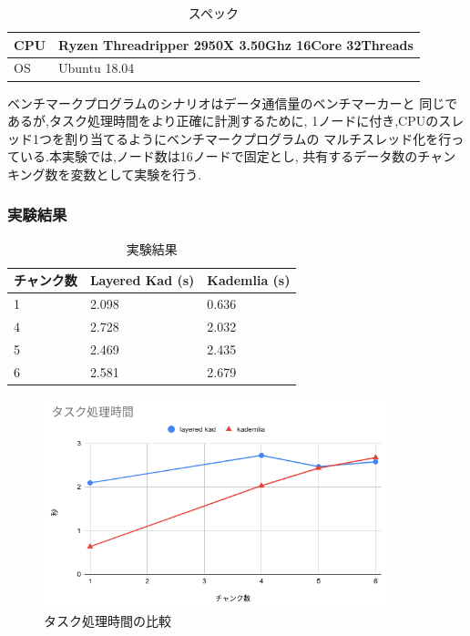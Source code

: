 \documentclass[sotsuron]{jcsie}
\begin{document}
\begin{table}[H]
	\caption{スペック}	
	\centering
	\label{table:spec-ryzen}
	\begin{tabular}{|l|l|}
		\hline
		CPU &   
		Ryzen Threadripper 2950X 3.50Ghz 16Core 32Threads \\ 
		\hline	
		OS  &   
		Ubuntu 18.04 \\ 
		\hline
	\end{tabular}	
\end{table}

ベンチマークプログラムのシナリオはデータ通信量のベンチマーカーと
同じであるが,タスク処理時間をより正確に計測するために,
1ノードに付き,CPUのスレッド1つを割り当てるようにベンチマークプログラムの
マルチスレッド化を行っている.本実験では,ノード数は16ノードで固定とし,
共有するデータ数のチャンキング数を変数として実験を行う.

\subsubsection{実験結果}
\begin{table}[H]
	\caption{実験結果}	
	\centering
	\label{table:calc-result}
	\begin{tabular}{|l|l|l|}
		\hline
		チャンク数 &   
		Layered Kad (s) &   
		Kademlia (s)\\ 
		\hline
		1               &   
		2.098           &   
		0.636\\
		\hline
		4               &   
		2.728           &   
		2.032\\
		\hline
		5               &   
		2.469           &   
		2.435\\
		\hline
		6               &   
		2.581           &   
		2.679\\
		\hline
	\end{tabular}	
\end{table}

\begin{figure}[H]
	\centering
	\includegraphics[width=10cm]{./assets/image/calc_compare.png}
	\caption{タスク処理時間の比較}
	\label{fig:calc_compare.png}
\end{figure}
\end{document}
